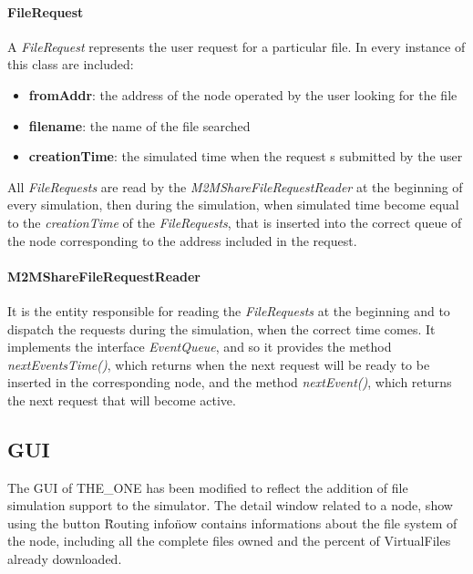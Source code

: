 \paragraph{FileRequest}
A \textit{FileRequest} represents the user request for a particular file. In every instance of this class are included:
\begin{itemize}
\item \textbf{fromAddr}: the address of the node operated by the user looking for the file
\item \textbf{filename}: the name of the file searched
\item \textbf{creationTime}: the simulated time when the request s submitted by the user 
\end{itemize}
All \textit{FileRequests} are read by the \textit{M2MShareFileRequestReader} at the beginning of every simulation, then during the simulation, when simulated time become equal to the \textit{creationTime} of the \textit{FileRequests}, that is inserted into the correct queue of the node corresponding to the address included in the request.

\paragraph{M2MShareFileRequestReader}
It is the entity responsible for reading the \textit{FileRequests} at the beginning and to dispatch the requests during the simulation, when the correct time comes. It implements the interface \textit{EventQueue}, and so it provides the method \textit{nextEventsTime()}, which returns when the next request will be ready to be inserted in the corresponding node, and the method \textit{nextEvent()}, which returns the next request that will become active.


\subsection{GUI}
The GUI of THE_ONE has been modified to reflect the addition of file simulation support to the simulator. The detail window related to a node, show using the button \"Routing info\" now contains informations about the file system of the node, including all the complete files owned and the percent of VirtualFiles already downloaded. 

